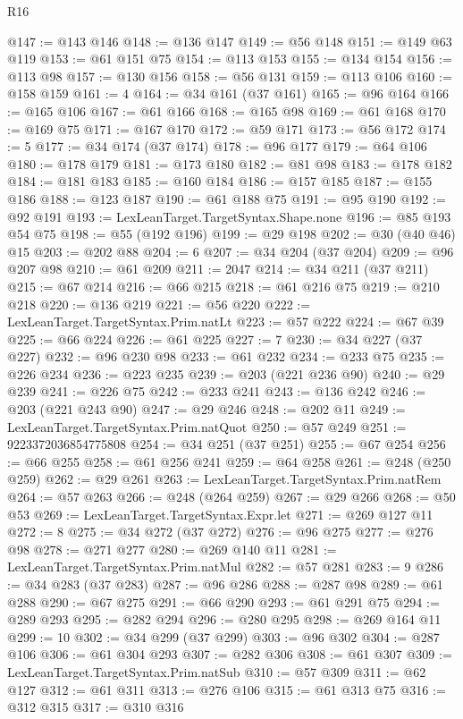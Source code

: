 \begin{lexlean}{R16}
\begin{coremodule}
@147 := @143 @146
@148 := @136 @147
@149 := @56 @148
@151 := @149 @63 @119
@153 := @61 @151 @75
@154 := @113 @153
@155 := @134 @154
@156 := @113 @98
@157 := @130 @156
@158 := @56 @131
@159 := @113 @106
@160 := @158 @159
@161 := 4
@164 := @34 @161 (@37 @161)
@165 := @96 @164
@166 := @165 @106
@167 := @61 @166
@168 := @165 @98
@169 := @61 @168
@170 := @169 @75
@171 := @167 @170
@172 := @59 @171
@173 := @56 @172
@174 := 5
@177 := @34 @174 (@37 @174)
@178 := @96 @177
@179 := @64 @106
@180 := @178 @179
@181 := @173 @180
@182 := @81 @98
@183 := @178 @182
@184 := @181 @183
@185 := @160 @184
@186 := @157 @185
@187 := @155 @186
@188 := @123 @187
@190 := @61 @188 @75
@191 := @95 @190
@192 := @92 @191
@193 := LexLeanTarget.TargetSyntax.Shape.none
@196 := @85 @193 @54 @75
@198 := @55 (@192 @196)
@199 := @29 @198
@202 := @30 (@40 @46) @15
@203 := @202 @88
@204 := 6
@207 := @34 @204 (@37 @204)
@209 := @96 @207 @98
@210 := @61 @209
@211 := 2047
@214 := @34 @211 (@37 @211)
@215 := @67 @214
@216 := @66 @215
@218 := @61 @216 @75
@219 := @210 @218
@220 := @136 @219
@221 := @56 @220
@222 := LexLeanTarget.TargetSyntax.Prim.natLt
@223 := @57 @222
@224 := @67 @39
@225 := @66 @224
@226 := @61 @225
@227 := 7
@230 := @34 @227 (@37 @227)
@232 := @96 @230 @98
@233 := @61 @232
@234 := @233 @75
@235 := @226 @234
@236 := @223 @235
@239 := @203 (@221 @236 @90)
@240 := @29 @239
@241 := @226 @75
@242 := @233 @241
@243 := @136 @242
@246 := @203 (@221 @243 @90)
@247 := @29 @246
@248 := @202 @11
@249 := LexLeanTarget.TargetSyntax.Prim.natQuot
@250 := @57 @249
@251 := 9223372036854775808
@254 := @34 @251 (@37 @251)
@255 := @67 @254
@256 := @66 @255
@258 := @61 @256 @241
@259 := @64 @258
@261 := @248 (@250 @259)
@262 := @29 @261
@263 := LexLeanTarget.TargetSyntax.Prim.natRem
@264 := @57 @263
@266 := @248 (@264 @259)
@267 := @29 @266
@268 := @50 @53
@269 := LexLeanTarget.TargetSyntax.Expr.let
@271 := @269 @127 @11
@272 := 8
@275 := @34 @272 (@37 @272)
@276 := @96 @275
@277 := @276 @98
@278 := @271 @277
@280 := @269 @140 @11
@281 := LexLeanTarget.TargetSyntax.Prim.natMul
@282 := @57 @281
@283 := 9
@286 := @34 @283 (@37 @283)
@287 := @96 @286
@288 := @287 @98
@289 := @61 @288
@290 := @67 @275
@291 := @66 @290
@293 := @61 @291 @75
@294 := @289 @293
@295 := @282 @294
@296 := @280 @295
@298 := @269 @164 @11
@299 := 10
@302 := @34 @299 (@37 @299)
@303 := @96 @302
@304 := @287 @106
@306 := @61 @304 @293
@307 := @282 @306
@308 := @61 @307
@309 := LexLeanTarget.TargetSyntax.Prim.natSub
@310 := @57 @309
@311 := @62 @127
@312 := @61 @311
@313 := @276 @106
@315 := @61 @313 @75
@316 := @312 @315
@317 := @310 @316

\end{coremodule}
\end{lexlean}
